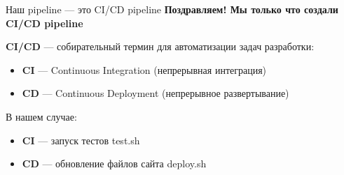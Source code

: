 \documentclass[aspectratio=169]{beamer}
\begin{document}
    \begin{frame}{Наш pipeline — это CI/CD pipeline}
        \textbf{Поздравляем! Мы только что создали CI/CD pipeline}
        
        \vspace{0.5cm}
        
        \textbf{CI/CD} — собирательный термин для автоматизации задач разработки:
        \begin{itemize}
            \item \textbf{CI} — Continuous Integration (непрерывная интеграция)
            \item \textbf{CD} — Continuous Deployment (непрерывное развертывание)
        \end{itemize}
        
        \vspace{0.5cm}

        В нашем случае:
        \begin{itemize}
            \item \textbf{CI} — запуск тестов test.sh
            \item \textbf{CD} — обновление файлов сайта deploy.sh
        \end{itemize}
    \end{frame}
\end{document}
